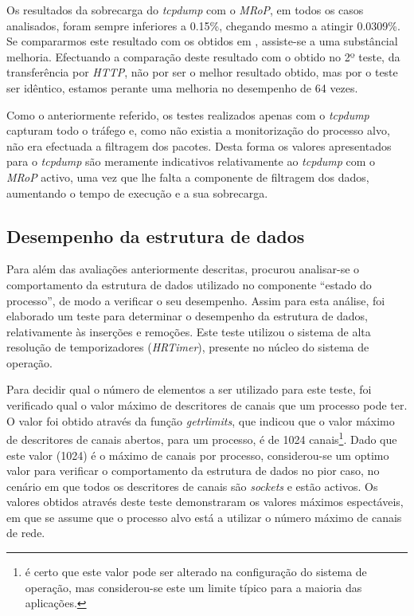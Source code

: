 Os resultados da sobrecarga do \textit{tcpdump} com o \textit{MRoP}, em todos os casos analisados, foram sempre inferiores a 0.15\%, chegando mesmo a atingir 0.0309\%.
Se compararmos este resultado com os obtidos em \cite{Farruca:2009}, assiste-se a uma substâncial melhoria.
Efectuando a comparação deste resultado com o obtido no 2º teste, da transferência por \textit{HTTP}, não por ser o melhor resultado obtido, mas por o teste ser idêntico, estamos perante uma melhoria no desempenho de 64 vezes.

Como o anteriormente referido, os testes realizados apenas com o \textit{tcpdump} capturam todo o tráfego e, como não existia a monitorização do processo alvo, não era efectuada a filtragem dos pacotes.
Desta forma os valores apresentados para o \textit{tcpdump} são meramente indicativos relativamente ao \textit{tcpdump} com o \textit{MRoP} activo, uma vez que lhe falta a componente de filtragem dos dados, aumentando o tempo de execução e a sua sobrecarga.

\subsection{Desempenho da estrutura de dados}

Para além das avaliações anteriormente descritas, procurou analisar-se o comportamento da estrutura de dados utilizado no componente “estado do processo”, de modo a verificar o seu desempenho.
Assim para esta análise, foi elaborado um teste para determinar o desempenho da estrutura de dados, relativamente às inserções e remoções.
Este teste utilizou o sistema de alta resolução de temporizadores (\textit{HRTimer})\cite{hrtimerKernel}, presente no núcleo do sistema de operação.

Para decidir qual o número de elementos a ser utilizado para este teste, foi verificado qual o valor máximo de descritores de canais que um processo pode ter.
O valor foi obtido através da função \textit{getrlimits}, que indicou que o valor máximo de descritores de canais abertos, para um processo, é de 1024 canais\footnote{é certo que este valor pode ser alterado na configuração do sistema de operação, mas considerou-se este um limite típico para a maioria das aplicações.}.
Dado que este valor (1024) é o máximo de canais por processo, considerou-se um optimo valor para verificar o comportamento da estrutura de dados no pior caso, no cenário em que todos os descritores de canais são \textit{sockets} e estão activos.
Os valores obtidos através deste teste demonstraram os valores máximos espectáveis, em que se assume que o processo alvo está a utilizar o número máximo de canais de rede.


